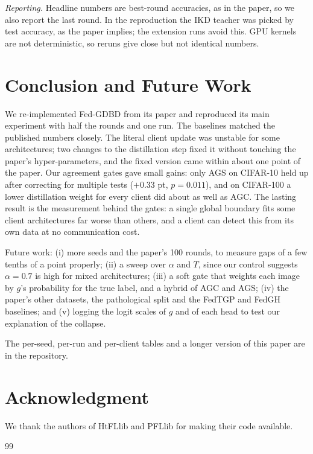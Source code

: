 \documentclass[conference]{IEEEtran}
\begin{document}
\textit{Reporting.} Headline numbers are best-round accuracies, as in the paper, so we also report the last round. In the reproduction the IKD teacher was picked by test accuracy, as the paper implies; the extension runs avoid this. GPU kernels are not deterministic, so reruns give close but not identical numbers.

\section{Conclusion and Future Work}

We re-implemented Fed-GDBD from its paper and reproduced its main experiment with half the rounds and one run. The baselines matched the published numbers closely. The literal client update was unstable for some architectures; two changes to the distillation step fixed it without touching the paper's hyper-parameters, and the fixed version came within about one point of the paper. Our agreement gates gave small gains: only AGS on CIFAR-10 held up after correcting for multiple tests ($+0.33$ pt, $p=0.011$), and on CIFAR-100 a lower distillation weight for every client did about as well as AGC. The lasting result is the measurement behind the gates: a single global boundary fits some client architectures far worse than others, and a client can detect this from its own data at no communication cost.

Future work: (i) more seeds and the paper's 100 rounds, to measure gaps of a few tenths of a point properly; (ii) a sweep over $\alpha$ and $T$, since our control suggests $\alpha=0.7$ is high for mixed architectures; (iii) a soft gate that weights each image by $g$'s probability for the true label, and a hybrid of AGC and AGS; (iv) the paper's other datasets, the pathological split and the FedTGP and FedGH baselines; and (v) logging the logit scales of $g$ and of each head to test our explanation of the collapse.

The per-seed, per-run and per-client tables and a longer version of this paper are in the repository.

\section*{Acknowledgment}
We thank the authors of HtFLlib and PFLlib for making their code available.

\begin{thebibliography}{99}

\end{thebibliography}
\end{document}
